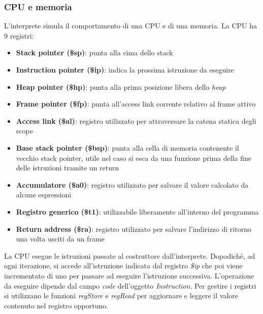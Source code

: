 \documentclass[../../main]{subfiles}
\begin{document}
\subsubsection{CPU e memoria}
L'interprete simula il comportamento di una CPU e di una memoria.
La CPU ha 9 registri: 
\begin{itemize}
    \item \textbf{Stack pointer (\$sp)}: punta alla cima dello stack
    \item \textbf{Instruction pointer (\$ip)}: indica la prossima istruzione da eseguire
    \item \textbf{Heap pointer (\$hp)}: punta alla prima posizione libera dello \emph{heap}
    \item \textbf{Frame pointer (\$fp)}: punta all'access link corrente relativo al frame attivo
    \item \textbf{Access link (\$al)}: registro utilizzato per attraversare la catena statica degli scope
    \item \textbf{Base stack pointer (\$bsp)}: punta alla cella di memoria contenente il vecchio stack pointer, utile nel caso si esca da una funzione prima della fine delle istruzioni tramite un return
    \item \textbf{Accumulatore (\$a0)}: registro utilizzato per salvare il valore calcolato da alcune espressioni
    \item \textbf{Registro generico (\$t1)}: utilizzabile liberamente all'interno del programma  
    \item \textbf{Return address (\$ra)}: registro utilizzato per salvare l'indirizzo di ritorno una volta usciti da un frame
\end{itemize}
La CPU esegue le istruzioni passate al costruttore dall'interprete. Dopodiché, ad ogni iterazione, si accede all'istruzione indicata dal registro \emph{\$ip} che poi viene incrementato di uno per passare ad eseguire l'istruzione successiva. L'operazione da eseguire dipende dal campo \emph{code} dell'oggetto \emph{Instruction}.  
\newline
Per gestire i registri si utilizzano le funzioni \emph{regStore} e \emph{regRead} per aggiornare e leggere il valore contenuto nel registro opportuno.
\newline
\end{document}
